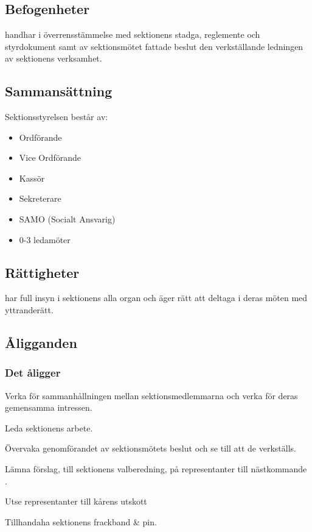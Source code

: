 \section{\STYRITFULL}
 
\subsection{Befogenheter}
\STYRIT{} handhar i överrensstämmelse med sektionens stadga, reglemente och
styrdokument samt av sektionsmötet fattade beslut den verkställande
ledningen av sektionens verksamhet.
 
\subsection{Sammansättning}
Sektionsstyrelsen består av:
\begin{itemize}
	\item Ordförande
	\item Vice Ordförande
	\item Kassör
	\item Sekreterare
	\item SAMO (Socialt Ansvarig)
	\item 0-3 ledamöter
\end{itemize} 
 
\subsection{Rättigheter}
\STYRIT{} har full insyn i sektionens alla organ och äger rätt att deltaga i deras
möten med yttranderätt.
  
\subsection{Åligganden}

\subsubsection{Det åligger \STYRIT}

\begin{att}
	\item Verka för sammanhållningen mellan sektionsmedlemmarna och verka för deras gemensamma intressen.
	\item Leda sektionens arbete.
	\item Övervaka genomförandet av sektionsmötets beslut och se till att de verkställs.
	\item Lämna förslag, till sektionens valberedning, på representanter till nästkommande \STYRIT.
	\item Utse representanter till kårens utskott
	\item Tillhandaha sektionens frackband \& pin.
\end{att}

